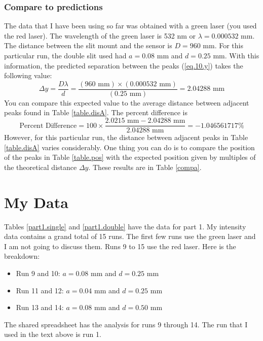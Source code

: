 \subsubsection{Compare to predictions}
The data that I have been using so far was obtained with a green laser (you used the red laser). The wavelength of the green laser is 532 nm or $\lambda = 0.000532$ mm. The distance between the slit mount and the sensor is $D = 960$ mm. For this particular run, the double slit used had $a = 0.08$ mm and $d = 0.25$ mm. With this information, the predicted separation between the peaks (\ref{eq.10.y}) takes the following value:
\begin{equation}
	\Delta y = \frac{D \lambda}{d} = \frac{(960 \text{ mm}) \times (0.000532 \text{ mm})}{(0.25 \text{ mm})} = 2.04288 \text{ mm}
\end{equation}
You can compare this expected value to the average distance between adjacent peaks found in Table \ref{table.disA}. The percent difference is
\begin{equation}
	\text{Percent Difference} = 100 \times \frac{2.0215 \text{ mm} - 2.04288 \text{ mm}}{2.04288 \text{ mm}} = -1.046561717 \%
\end{equation}
However, for this particular run, the distance between adjacent peaks in Table \ref{table.disA} varies considerably. One thing you can do is to compare the position of the peaks in Table \ref{table.pos} with the expected position given by multiples of the theoretical distance $\Delta y$. These results are in Table \ref{compa}.
\section{My Data}
Tables \ref{part1.single} and \ref{part1.double} have the data for part 1. My intensity data contains a grand total of 15 runs. The first few runs use the green laser and I am not going to discuss them. Runs 9 to 15 use the red laser. Here is the breakdown:
\begin{itemize}
	\item Run 9 and 10: $a = 0.08$ mm and $d = 0.25$ mm
	\item Run 11 and 12: $a = 0.04$ mm and $d = 0.25$ mm
	\item Run 13 and 14: $a = 0.08$ mm and $d = 0.50$ mm
\end{itemize}
The shared spreadsheet has the analysis for runs 9 through 14. The run that I used in the text above is run 1.

